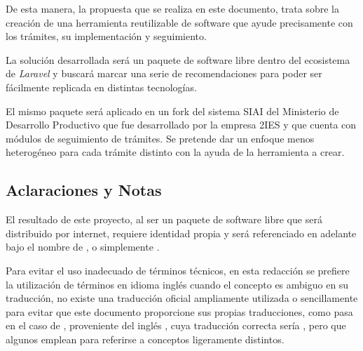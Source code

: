 De esta manera, la propuesta que se realiza en este documento, trata sobre la creación de una herramienta reutilizable de software que ayude precisamente con los trámites, su implementación y seguimiento.

La solución desarrollada será un paquete de software libre dentro del ecosistema de \textit{Laravel} y buscará marcar una serie de recomendaciones para poder ser fácilmente replicada en distintas tecnologías.

El mismo paquete será aplicado en un fork del sistema SIAI del Ministerio de Desarrollo Productivo que fue desarrollado por la empresa 2IES y que cuenta con módulos de seguimiento de trámites. Se pretende dar un enfoque menos heterogéneo para cada trámite distinto con la ayuda de la herramienta a crear.

\subsection{Aclaraciones y Notas}
El resultado de este proyecto, al ser un paquete de software libre que será distribuido por internet, requiere identidad propia y será referenciado en adelante bajo el nombre de , o simplemente .

Para evitar el uso inadecuado de términos técnicos, en esta redacción se prefiere la utilización de
términos en idioma inglés cuando el concepto es ambiguo en su traducción, no
existe una traducción oficial ampliamente utilizada o sencillamente para evitar
que este documento proporcione sus propias traducciones, como pasa en el caso de , proveniente del inglés , cuya traducción correcta sería , pero que algunos emplean para referirse a conceptos ligeramente distintos.